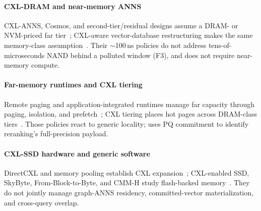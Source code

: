 \paragraph{CXL-DRAM and near-memory ANNS}
CXL-ANNS, Cosmos, and second-tier/residual designs assume a DRAM- or NVM-priced far tier~\cite{cxlanns,cosmos,secondtier,fatrq,hm-ann}; CXL-aware vector-database restructuring makes the same memory-class assumption~\cite{bauhaus}.
Their $\sim$100\,ns policies do not address tens-of-microseconds NAND behind a polluted window (F3), and \sys{} does not require near-memory compute.

\paragraph{Far-memory runtimes and CXL tiering}
Remote paging and application-integrated runtimes manage far capacity through paging, isolation, and prefetch~\cite{infiniswap,canvas,aifm,leap,rethinkingruntimes}; CXL tiering places hot pages across DRAM-class tiers~\cite{tpp,nomad,neomem,memtierscxl,canfarmemory,pond}.
Those policies react to generic locality; \sys{} uses PQ commitment to identify reranking's full-precision payload.

\paragraph{CXL-SSD hardware and generic software}
DirectCXL and memory pooling establish CXL expansion~\cite{directcxl,memorypooling}; CXL-enabled SSD, SkyByte, From-Block-to-Byte, and CMM-H study flash-backed memory~\cite{cxlssd,skybyte,fromblocktobyte,cmmh}.
They do not jointly manage graph-ANNS residency, committed-vector materialization, and cross-query overlap.

